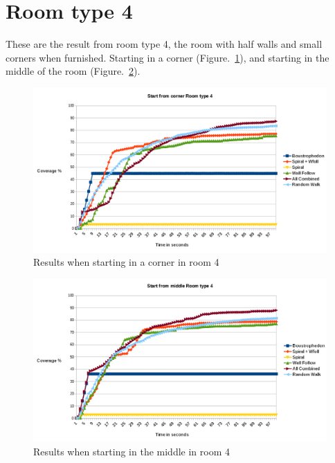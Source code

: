 \documentclass[bachelor]{kththesis}
\begin{document}
\section{Room type 4}
These are the result from room type 4, the room with half walls and small corners when furnished. Starting in a corner (Figure.~\ref{fig:corner4}), and starting in the middle of the room (Figure.~\ref{fig:middle4}).
\begin{figure}[H]
	\includegraphics[width=15cm]{img/cornerroom2furnchart.png}
	\centering
	\caption{Results when starting in a corner in room 4}
	\label{fig:corner4}
\end{figure}
\begin{figure}[H]
	\includegraphics[width=15cm]{img/middleroom2furnchart.png}
	\centering
	\caption{Results when starting in the middle in room 4}
	\label{fig:middle4}
\end{figure}
\end{document}
